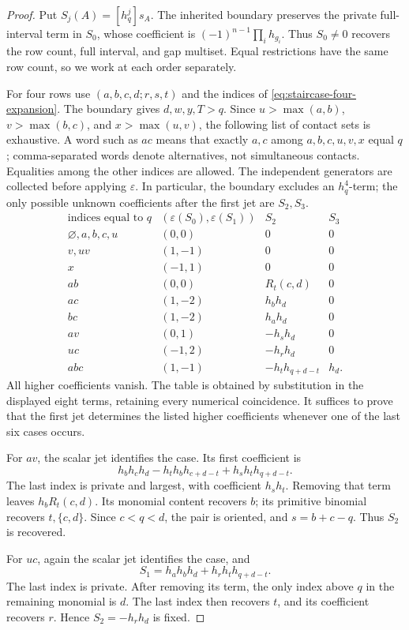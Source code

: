 \documentclass[11pt,a4paper]{amsart}
\numberwithin{equation}{section}
\theoremstyle{plain}
\theoremstyle{definition}
\begin{document}
\begin{proof}
Put \(S_j(A)=[h_q^j]s_A\).  The inherited boundary preserves the private
full-interval term in \(S_0\), whose coefficient is
\((-1)^{n-1}\prod_i h_{g_i}\).  Thus \(S_0\ne0\) recovers the row
count, full interval, and gap multiset.  Equal restrictions have the same
row count, so we work at each order separately.

For four rows use \((a,b,c,d;r,s,t)\) and the indices of
\eqref{eq:staircase-four-expansion}.  The boundary gives
\(d,w,y,T>q\).  Since \(u>\max(a,b)\), \(v>\max(b,c)\), and
\(x>\max(u,v)\), the following list of contact sets is exhaustive.
A word such as \(ac\) means that exactly \(a,c\) among
\(a,b,c,u,v,x\) equal \(q\); comma-separated words denote
alternatives, not simultaneous contacts.  Equalities among the other
indices are allowed.  The independent generators are collected before
applying \(\varepsilon\).  In particular, the boundary excludes an
\(h_q^4\)-term; the only possible unknown coefficients after the
first jet are \(S_2,S_3\).
\[
\begin{array}{c|c|c|c}
\text{indices equal to }q&(\varepsilon(S_0),\varepsilon(S_1))&S_2&S_3\\\hline
\varnothing,a,b,c,u&(0,0)&0&0\\
v,uv&(1,-1)&0&0\\
x&(-1,1)&0&0\\
ab&(0,0)&R_t(c,d)&0\\
ac&(1,-2)&h_bh_d&0\\
bc&(1,-2)&h_ah_d&0\\
av&(0,1)&-h_sh_d&0\\
uc&(-1,2)&-h_rh_d&0\\
abc&(1,-1)&-h_th_{q+d-t}&h_d.
\end{array}
\]
All higher coefficients vanish.  The table is obtained by substitution
in the displayed eight terms, retaining every numerical coincidence.
It suffices to prove that the first jet determines the listed higher
coefficients whenever one of the last six cases occurs.

For \(av\), the scalar jet identifies the case.  Its first coefficient is
\[
 h_bh_ch_d-h_th_bh_{c+d-t}+h_sh_th_{q+d-t}.
\]
The last index is private and largest, with coefficient \(h_sh_t\).
Removing that term leaves \(h_bR_t(c,d)\).  Its monomial content
recovers \(b\); its primitive binomial recovers \(t,\{c,d\}\).
Since \(c<q<d\), the pair is oriented, and \(s=b+c-q\).
Thus \(S_2\) is recovered.

For \(uc\), again the scalar jet identifies the case, and
\[
 S_1=h_ah_bh_d+h_rh_th_{q+d-t}.
\]
The last index is private.  After removing its term, the only index above
\(q\) in the remaining monomial is \(d\).  The last index then
recovers \(t\), and its coefficient recovers \(r\).  Hence
\(S_2=-h_rh_d\) is fixed.


\end{proof}
\end{document}
